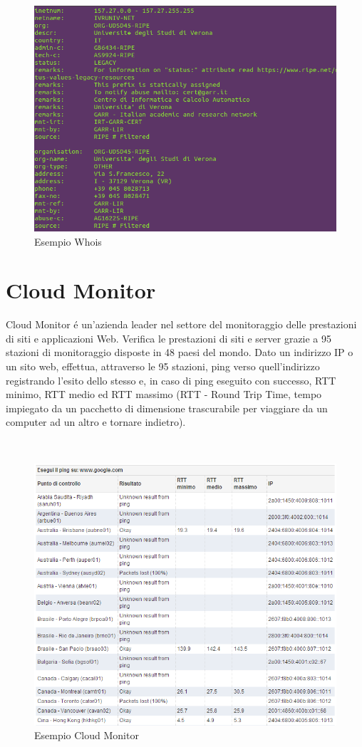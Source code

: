 \documentclass[a4paper,11pt]{book}
\begin{document}
\begin{figure}[h!t]
\centering
\includegraphics[scale = 0.7]{Whois.png}
\caption{Esempio Whois}
\end{figure}

\clearpage

\section{Cloud Monitor}
Cloud Monitor \'e un'azienda leader nel settore del monitoraggio delle prestazioni di siti e applicazioni Web. Verifica le prestazioni di siti e server grazie a 95 stazioni di monitoraggio disposte in 48 paesi del mondo. 
Dato un indirizzo IP o un sito web, effettua, attraverso le 95 stazioni, ping verso quell'indirizzo registrando l'esito dello stesso e, in caso di ping eseguito con successo, RTT minimo, RTT medio ed RTT massimo (RTT - Round Trip Time, tempo impiegato da un pacchetto di dimensione trascurabile per viaggiare da un computer ad un altro e tornare indietro). 

~

\begin{figure}[h!t]
\centering
\includegraphics[scale = 0.7]{Cloud_Monitor.png}
\caption{Esempio Cloud Monitor}
\end{figure}
\end{document}

